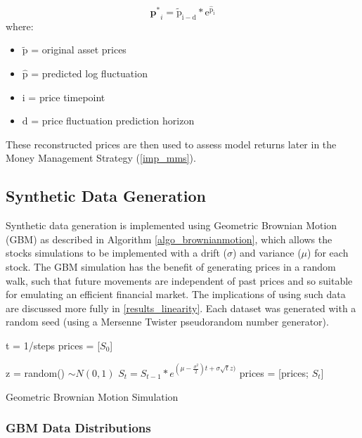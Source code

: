 \documentclass[a4paper,11pt,oneside]{article}
\theoremstyle{plain}
\theoremstyle{definition}
\begin{document}
	\begin{equation}
	\mathbf{p^*}_{i} = \mathrm{\tilde{p}_{i-d} * e^{\hat{p}_{i}}}
	\end{equation}
	where:
	\begin{itemize}
		\item [] $\mathrm{\tilde{p}}$ = original asset prices
		\item [] $\mathrm{\hat{p}}$ = predicted log fluctuation 
		\item [] $\mathrm{i}$ = price timepoint 
		\item [] $\mathrm{d}$ = price fluctuation prediction horizon
		
	\end{itemize}
	\texttt{}\newline
	These reconstructed prices are then used to assess model returns later in the Money Management Strategy (\ref{imp_mms}).
	
	\subsection{Synthetic Data Generation}\label{data_synthetic}
	
	Synthetic data generation is implemented using Geometric Brownian Motion (GBM) as described in Algorithm \ref{algo_brownianmotion}, which allows the stocks simulations to be implemented with a drift ($\sigma$) and variance ($\mu$) for each stock. The GBM simulation has the benefit of generating prices in a random walk, such that future movements are independent of past prices and so suitable for emulating an efficient financial market. The implications of using such data are discussed more fully in \ref{results_linearity}. Each dataset was generated with a random seed (using a Mersenne Twister pseudorandom number generator). \newline
	
	\begin{algorithm}[H]
		
		t = 1/steps\;
		prices = [$S_0$]\;
		
		{
			z = random()  $\sim N(0,1)$\;
			$S_t = S_{t-1}*e^{(\mu - \frac {\sigma^2}{2})t + \sigma  \sqrt{t}  z)}$\;
			prices = [prices; $S_t$]\;
		}
		\label{algo_brownianmotion}
		\caption{Geometric Brownian Motion Simulation}
	\end{algorithm}
	
	\subsubsection{GBM Data Distributions}
	
\end{document}
